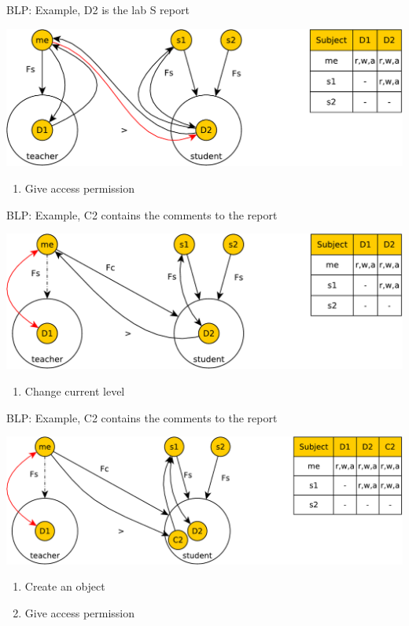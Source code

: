 \documentclass{beamer}
\begin{document}
\begin{frame}[t]{BLP: Example, D2 is the lab S report}
  \begin{center}
    \includegraphics[width=0.8\linewidth]{ex8}
  \end{center}
\begin{enumerate}
  \item Give access permission
\end{enumerate}
\end{frame}

\begin{frame}[t]{BLP: Example, C2 contains the comments to the report}
  \begin{center}
    \includegraphics[width=0.8\linewidth]{ex9}
  \end{center}
\begin{enumerate}
  \item Change current level
\end{enumerate}
\end{frame}

\begin{frame}[t]{BLP: Example, C2 contains the comments to the report}
  \begin{center}
    \includegraphics[width=0.8\linewidth]{ex10}
  \end{center}
\begin{enumerate}
  \item Create an object
  \item Give access permission
\end{enumerate}
\end{frame}
\end{document}
